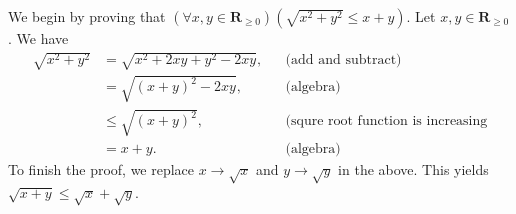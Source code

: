 \documentclass[12pt, fleqn, answers]{exam}
\newcommand{\reals}{\mathbf{R}}
\begin{document}
\begin{questions}
\begin{solution} We begin by proving that $\left(\forall x,y \in \reals_{\geq 0}\right)(\sqrt{x^2 + y^2} \leq x + y) $.
Let $x,y \in \reals_{\geq 0}$. We have
\begin{align*}
\sqrt{x^2 + y^2} &= \sqrt{x^2 + 2 x y + y^2 - 2 x y}, &&\mbox{(add and subtract)} \\
                           &= \sqrt{(x + y)^2 - 2 x y}, &&\mbox{(algebra)} \\
                           &\leq \sqrt{(x + y)^2}, &&\mbox{(squre root function is increasing} \\
                           &= x + y.  &&\mbox{(algebra)} 
\end{align*}
To finish the proof, we replace $x \to \sqrt{x}$ and  $y \to \sqrt{y}$ in the above. This yields
$\sqrt{x+y} \leq \sqrt{x} + \sqrt{y}$.

\end{solution}
\end{questions}
\end{document}

